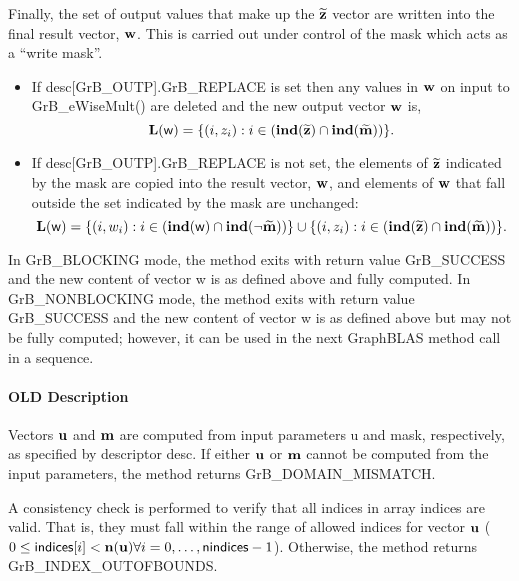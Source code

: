 Finally, the set of output values that make up the ${\bf \widetilde{z}}$ 
vector are written into the final result vector, ${\bf w}$. 
This is carried out under control of the mask which acts as a ``write mask''.
\begin{itemize}
\item If {\sf desc[GrB\_OUTP].GrB\_REPLACE} is set then any values in ${\bf w}$ 
on input to {\sf GrB\_eWiseMult()} are deleted and the new output vector ${\bf w}$ is,
\[ \bold{L}({\sf w}) = \{(i,z_{i}) : i \in (\bold{ind}({\bf \widetilde{z}}) 
\cap \bold{ind}({\bf \widetilde{m}})) \}. \]

\item If {\sf desc[GrB\_OUTP].GrB\_REPLACE} is not set, the elements of ${\bf \widetilde{z}}$ indicated by 
the mask are copied into the result vector, ${\bf w}$, and elements of 
${\bf w}$ that fall outside the set indicated by the mask are unchanged:
\[ \bold{L}({\sf w}) = \{(i,w_{i}) : i \in (\bold{ind}({\bf \sf w}) 
\cap \bold{ind}(\neg {\bf \widetilde{m}})) \} \cup \{(i,z_{i}) : i \in 
(\bold{ind}({\bf \widetilde{z}}) \cap \bold{ind}({\bf \widetilde{m}})) \}. \]
\end{itemize}

In {\sf GrB\_BLOCKING} mode, the method exits with return value 
{\sf GrB\_SUCCESS} and the new content of vector {\sf w} is as defined above
and fully computed.  
In {\sf GrB\_NONBLOCKING} mode, the method exits with return value 
{\sf GrB\_SUCCESS} and the new content of vector {\sf w} is as defined above 
but may not be fully computed; however, it can be used in the next GraphBLAS 
method call in a sequence.


\paragraph{OLD Description}

Vectors ${\bf u}$ and ${\bf m}$ are computed from input
parameters {\sf u} and {\sf mask}, respectively, as specified by
descriptor {\sf desc}.  If either ${\bf u}$ or ${\bf m}$
cannot be computed from the input parameters, the method returns {\sf
GrB\_DOMAIN\_MISMATCH}.

A consistency check is performed to verify that all indices in array
{\sf indices} are valid. That is, they must fall within the range of allowed
indices for vector ${\bf u}$ ($0 \leq {\sf indices}[i] < \bold{n}({\bf u})
\forall i = 0,\ldots,{\sf nindices}-1$).  Otherwise, the method returns {\sf
GrB\_INDEX\_OUTOFBOUNDS}.

